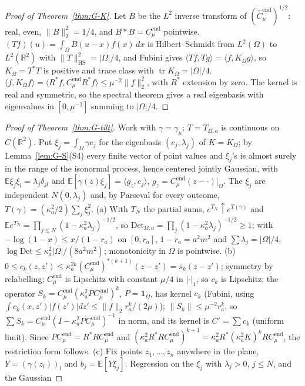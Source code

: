 \documentclass[11pt]{article}
\theoremstyle{plain}
\theoremstyle{definition}
\theoremstyle{remark}
\newcommand{\R}{\mathbb{R}}
\newcommand{\E}{\mathbb{E}}
\newcommand{\ind}{\mathbf{1}}
\newcommand{\Cend}{C^{\mathrm{end}}_{\mu}}
\newcommand{\hCend}{\hat C^{\mathrm{end}}_{\mu}}
\newcommand{\Det}{\mathrm{Det}}
\DeclareMathOperator{\trace}{tr}
\begin{document}
\begin{proof}[Proof of Theorem~\ref{thm:G-K}]
Let $B$ be the $L^{2}$ inverse transform of $(\hCend)^{1/2}$: real, even,
$\|B\|_2^{2}=1/4$, and $B*B=\Cend$ pointwise. $(Tf)(u)=\int_\Omega B(u-x)f(x)\,dx$ is
Hilbert--Schmidt from $L^{2}(\Omega)$ to $L^{2}(\R^{2})$ with $\|T\|_{\mathrm{HS}}^{2}=|\Omega|/4$, and Fubini gives
$\langle Tf,Tg\rangle=\langle f,K_\Omega g\rangle$, so $K_\Omega=T^{*}T$ is positive and trace class with $\trace K_\Omega=|\Omega|/4$.
$\langle f,K_\Omega f\rangle=\langle R^{*}f,\Cend R^{*}f\rangle\le\mu^{-2}\|f\|_2^{2}$, with $R^{*}$ extension by zero. The kernel is
real and symmetric, so the spectral theorem gives a real eigenbasis with
eigenvalues in $[0,\mu^{-2}]$ summing to $|\Omega|/4$.
\end{proof}

\begin{proof}[Proof of Theorem~\ref{thm:G-tilt}]
Work with $\gamma=\gamma_\mu$; $T=T_{\Omega,a}$ is continuous on $C(\R^{2})$. Put
$\xi_j=\int_\Omega\gamma e_j$ for the eigenbasis $(e_j,\lambda_j)$ of $K=K_\Omega$; by Lemma~\ref{lem:G-S}(S4)
every finite vector of point values and $\xi_j$'s is almost surely in the range of
the isonormal process, hence centered jointly Gaussian, with
$\E\xi_j\xi_l=\lambda_j\delta_{jl}$ and $\E[\gamma(z)\xi_j]=\langle g_z,e_j\rangle$, $g_z=\Cend(z-\cdot)|_\Omega$. The $\xi_j$ are independent
$N(0,\lambda_j)$ and, by Parseval for every outcome, $T(\gamma)=(\kappa_a^{2}/2)\sum_j\xi_j^{2}$.
(a) With $T_N$ the partial sums, $e^{T_N}\uparrow e^{T(\gamma)}$ and
$\E e^{T_N}=\prod_{j\le N}(1-\kappa_a^{2}\lambda_j)^{-1/2}$, so $\Det_{\Omega,a}=\prod_j(1-\kappa_a^{2}\lambda_j)^{-1/2}\ge1$; with
$-\log(1-x)\le x/(1-r_a)$ on $[0,r_a]$, $1-r_a=a^{2}m^{2}$ and $\sum\lambda_j=|\Omega|/4$,
$\log\Det\le\kappa_a^{2}|\Omega|/(8a^{2}m^{2})$; monotonicity in $\Omega$ is pointwise.
(b) $0\le c_k(z,z')\le\kappa_a^{2k}(\Cend)^{*(k+1)}(z-z')=s_k(z-z')$; symmetry by relabelling; $\Cend$ is
Lipschitz with constant $\mu/4$ in $|\cdot|_1$, so $c_k$ is Lipschitz; the operator
$S_k=\Cend(\kappa_a^{2}P\Cend)^{k}$, $P=\ind_\Omega$, has kernel $c_k$ (Fubini, using
$\int c_k(x,z')|f(z')|dz'\le\|f\|_2r_a^{k}/(2\mu)$); $\|S_k\|\le\mu^{-2}r_a^{k}$, so
$\sum S_k=\Cend(I-\kappa_a^{2}P\Cend)^{-1}$ in norm, and its kernel is $C'=\sum c_k$ (uniform limit).
Since $P\Cend=R^{*}R\Cend$ and $(\kappa_a^{2}R^{*}R\Cend)^{k+1}=\kappa_a^{2}R^{*}(\kappa_a^{2}K)^{k}R\Cend$, the restriction form
follows.
(c) Fix points $z_1,\dots,z_n$ anywhere in the plane, $Y=(\gamma(z_l))_l$ and
$b_j=\E[Y\xi_j]$. Regression on the $\xi_j$ with $\lambda_j>0$, $j\le N$, and the Gaussian

\end{proof}
\end{document}
